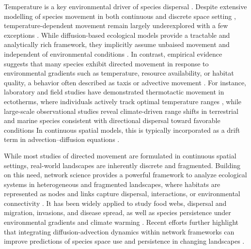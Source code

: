 \documentclass[12pt]{article}
\begin{document}
Temperature is a key environmental driver of species dispersal \cite{travis2013dispersal}. Despite extensive modelling of species movement in both continuous and discrete space setting \cite{cantrell2004spatial,cosner2014reaction,cantrell1991effects,neubert1995dispersal}, temperature-dependent movement remain largely underexplored with a few exceptions \cite{dornelas2024movement,maciel2013individual}.
 While diffusion-based ecological models provide a tractable and analytically rich framework, they implicitly assume unbaised movement and independent of environmental conditions \cite{mcpeek1992evolution,cantrell2006movement}. In contrast, empirical evidence suggests that many species exhibit directed movement in response to environmental gradients such as temperature, resource availability, or habitat quality, a behavior often described as taxis or advective movement \cite{chen2011rapid,parmesan2003globally}. For instance, laboratory and field studies have demonstrated thermotactic movement in ectotherms, where individuals actively track optimal temperature ranges \cite{angilletta2009thermal}, while large-scale observational studies reveal climate-driven range shifts in terrestrial and marine species consistent with directional dispersal toward favorable conditions\cite{chen2011rapid,pecl2017biodiversity,turchin1998quantitative} In continuous spatial models, this is typically incorporated as a drift term in advection–diffusion equations \cite{belgacem1995effects,cosner2003does,potapov2004climate,urban2012collision}. 

While most studies of directed movement are formulated in continuous spatial settings, real-world landscapes are inherently discrete and fragmented. Building on this need, network science provides a powerful framework to analyze ecological systems in heterogeneous and fragmented landscapes, where habitats are represented as nodes and links capture dispersal, interactions, or environmental connectivity \cite{dale2017applying}. It has been widely applied to study food webs, dispersal and migration, invasions, and disease spread, as well as species persistence under environmental gradients and climate warming \cite{fortin2021network,tylianakis2017ecological,bascompte2003nested,chen2023evolution,bdolach2025tipping,bhandary2023rising,hastings2026tipping}. Recent efforts further highlight that integrating diffusion-advection dynamics within network frameworks can improve predictions of species space use and persistence in changing landscapes \cite{prima2018combining}.
\end{document}
